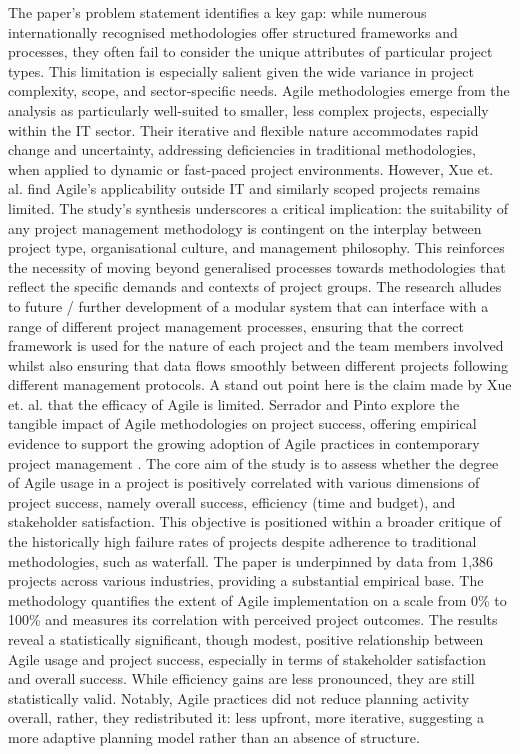 \documentclass{report}
\begin{document}
The paper’s problem statement identifies a key gap: while numerous internationally recognised methodologies offer structured frameworks and processes, they often fail to consider the unique attributes of particular project types. This limitation is especially salient given the wide variance in project complexity, scope, and sector-specific needs. Agile methodologies emerge from the analysis as particularly well-suited to smaller, less complex projects, especially within the IT sector. Their iterative and flexible nature accommodates rapid change and uncertainty, addressing deficiencies in traditional methodologies, when applied to dynamic or fast-paced project environments. However, Xue et. al. find Agile’s applicability outside IT and similarly scoped projects remains limited.
The study’s synthesis underscores a critical implication: the suitability of any project management methodology is contingent on the interplay between project type, organisational culture, and management philosophy. This reinforces the necessity of moving beyond generalised processes towards methodologies that reflect the specific demands and contexts of project groups.  
The research alludes to future / further development of a modular system that can interface with a range of different project management processes, ensuring that the correct framework is used for the nature of each project and the team members involved whilst also ensuring that data flows smoothly between different projects following different management protocols.
A stand out point here is the claim made by Xue et. al. that the efficacy of Agile is limited. Serrador and Pinto explore the tangible impact of Agile methodologies on project success, offering empirical evidence to support the growing adoption of Agile practices in contemporary project management \parencite{serradorDoesAgileWork2015}. The core aim of the study is to assess whether the degree of Agile usage in a project is positively correlated with various dimensions of project success, namely overall success, efficiency (time and budget), and stakeholder satisfaction. This objective is positioned within a broader critique of the historically high failure rates of projects despite adherence to traditional methodologies, such as waterfall.
The paper is underpinned by data from 1,386 projects across various industries, providing a substantial empirical base. The methodology quantifies the extent of Agile implementation on a scale from 0\% to 100\% and measures its correlation with perceived project outcomes. The results reveal a statistically significant, though modest, positive relationship between Agile usage and project success, especially in terms of stakeholder satisfaction and overall success. While efficiency gains are less pronounced, they are still statistically valid. Notably, Agile practices did not reduce planning activity overall, rather, they redistributed it: less upfront, more iterative, suggesting a more adaptive planning model rather than an absence of structure.
\end{document}
